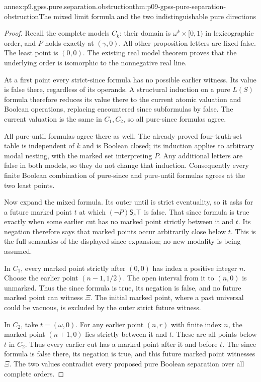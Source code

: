 \begin{annexitem}{annex:p9.gpss.pure.separation.obstruction}{thm:p09-gpss-pure-separation-obstruction}{The mixed limit formula and the two indistinguishable pure directions}
\begin{proof}
Recall the complete
models \(C_k\):
their domain is
\(\omega^k\times[0,1)\)
in lexicographic
order, and \(P\)
holds exactly at
\((\gamma,0)\).
All other proposition
letters are fixed
false. The least
point is \((0,0)\).
The existing real
model theorem proves
that the underlying
order is isomorphic
to the nonnegative
real line.

At a first point
every strict-since
formula has no
possible earlier
witness. Its
value is false
there, regardless
of its operands.
A structural
induction on a
pure \(L(S)\)
formula therefore
reduces its value
there to the
current atomic
valuation and
Boolean operations,
replacing encountered
since subformulas
by false.
The current valuation
is the same
in \(C_1,C_2\),
so all pure-since
formulas agree.

All pure-until
formulas agree
there as well.
The already proved
four-truth-set table
is independent
of \(k\) and
is Boolean closed;
its induction
applies to
arbitrary modal
nesting, with
the marked set
interpreting \(P\).
Any additional
letters are false
in both models,
so they do not
change that
induction.
Consequently every
finite Boolean
combination of
pure-since and
pure-until formulas
agrees at the
two least points.

Now expand the
mixed formula.
Its outer until
is strict
eventuality, so
it asks for
a future marked
point \(t\)
at which
\((\neg P)\mathbin{\mathsf S_s}\top\)
is false.
That since formula
is true exactly
when some earlier
cut has no
marked point
strictly between
it and \(t\).
Its negation
therefore says
that marked
points occur
arbitrarily close
below \(t\).
This is the
full semantics
of the displayed
since expansion;
no new modality
is being assumed.

In \(C_1\),
every marked
point strictly
after \((0,0)\)
has index a
positive integer
\(n\). Choose
the earlier
point \((n-1,1/2)\).
The open interval
from it to
\((n,0)\)
is unmarked.
Thus the since
formula is true,
its negation
is false, and
no future
marked point
can witness
\(\Xi\).
The initial
marked point,
where a past
universal could
be vacuous,
is excluded
by the outer
strict future
witness.

In \(C_2\),
take \(t=(\omega,0)\).
For any earlier
point \((n,r)\)
with finite
index \(n\),
the marked
point \((n+1,0)\)
lies strictly
between it
and \(t\).
These are
all points
below \(t\)
in \(C_2\).
Thus every
earlier cut
has a marked
point after
it and before
\(t\).
The since
formula is
false there,
its negation
is true, and
this future
marked point
witnesses \(\Xi\).
The two values
contradict every
proposed pure
Boolean separation
over all
complete orders.


\end{proof}
\end{annexitem}
